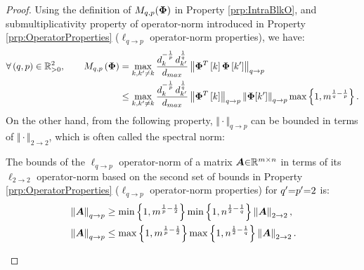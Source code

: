 \begin{proof}
Using the definition of $M_{q,p}(\boldsymbol{\Phi})$ in Property \ref{prp:IntraBlkO}, and submultiplicativity property of operator-norm introduced in Property \ref{prp:OperatorProperties} ($\ell_{q {\to} p}$ operator-norm properties), we have:
\begin{gather}
\begin{aligned}
\label{eq:BMCC_UpperBound} 
\forall \left( q , p \right) \in \mathbb{R}^2_{>0}, \qquad
M_{q,p}\left( \boldsymbol{\Phi} \right) &=
\max_{k,k' \neq k} \frac{d_{k}^{-\frac1p} \, d_{k'}^{\frac1q}}{d_{max}} \left\lVert\boldsymbol{\Phi}^T \left[ k \right] \boldsymbol{\Phi} \left[ k' \right]\right\rVert_{q \to p} \\
&\leq \max_{k,k' \neq k} \frac{d_{k}^{-\frac1p} \, d_{k'}^{\frac1q}}{d_{max}} 
\left\lVert\boldsymbol{\Phi}^T \left[ k \right]\right\rVert_{q \to p} \left\lVert\boldsymbol{\Phi}[k']\right\rVert_{q \to p} \max \left\lbrace 1 , m^{\frac1q - \frac1p} \right\rbrace.
\end{aligned}
\end{gather}
On the other hand, 
from the following property, 
$\Vert \cdot \Vert_{q {\to} p}$ can be bounded in terms of $\Vert \cdot \Vert_{2 {\to} 2}$, which is often called the spectral norm:
\begin{property}
\label{lm:qpTO22}
The bounds of the $\ell_{q {\to} p}$ operator-norm of a matrix $\boldsymbol{A} {\in} \mathbb{R}^{m {\times} n}$ in terms of its $\ell_{2 {\to} 2}$ operator-norm based on the second set of bounds in Property \ref{prp:OperatorProperties} ($\ell_{q {\to} p}$ operator-norm properties) for $q' {=} p' {=} 2$ is:
\begin{gather*}
\begin{aligned}
&\mynorm{\boldsymbol{A}}_{q \to p} \geq \min \mybrace{1 , m^{\frac1p - \frac{1}{2}}} \min \mybrace{1 , n^{\frac{1}{2} - \frac1q}} \mynorm{\boldsymbol{A}}_{2 \to 2}, \\
&\mynorm{\boldsymbol{A}}_{q \to p} \leq \max \mybrace{1 , m^{\frac1p - \frac{1}{2}}} \max \mybrace{1 , n^{\frac{1}{2} - \frac1q}} \mynorm{\boldsymbol{A}}_{2 \to 2}.

\end{aligned}
\end{gather*}
\end{property}
\end{proof}
